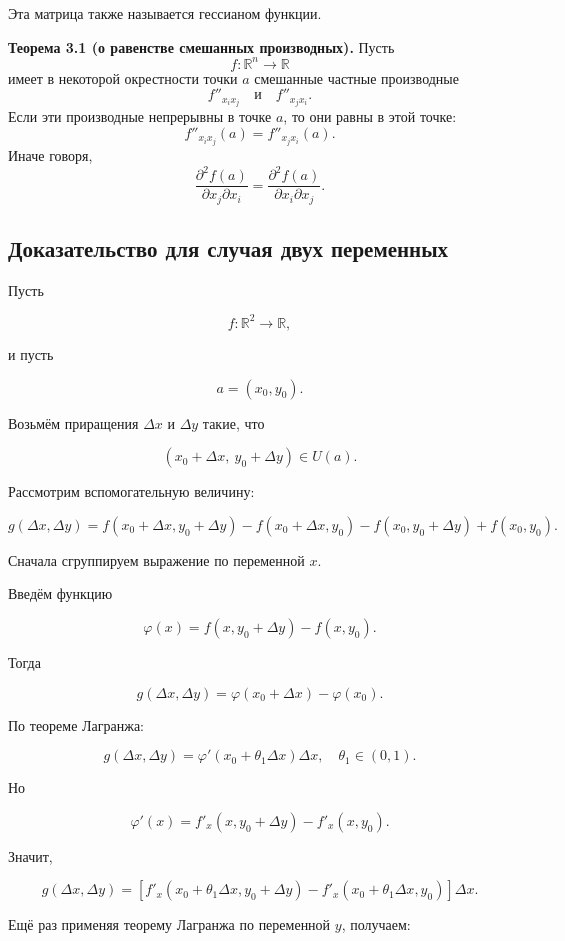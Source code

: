 \documentclass[a4paper,12pt]{article}
\begin{document}
Эта матрица также называется гессианом функции.

\begin{theorembox}
\textbf{Теорема 3.1 (о равенстве смешанных производных).}
Пусть
\[
f:\mathbb{R}^n\to\mathbb{R}
\]
имеет в некоторой окрестности точки $a$ смешанные частные производные
\[
f''_{x_i x_j}
\quad
\text{и}
\quad
f''_{x_j x_i}.
\]
Если эти производные непрерывны в точке $a$, то они равны в этой точке:
\[
f''_{x_i x_j}(a)
=
f''_{x_j x_i}(a).
\]
Иначе говоря,
\[
\frac{\partial^2 f(a)}{\partial x_j\partial x_i}
=
\frac{\partial^2 f(a)}{\partial x_i\partial x_j}.
\]
\end{theorembox}

\subsection*{Доказательство для случая двух переменных}

Пусть

\[
f:\mathbb{R}^2\to\mathbb{R},
\]

и пусть

\[
a=(x_0,y_0).
\]

Возьмём приращения $\Delta x$ и $\Delta y$ такие, что

\[
(x_0+\Delta x,\ y_0+\Delta y)\in U(a).
\]

Рассмотрим вспомогательную величину:

\[
g(\Delta x,\Delta y)
=
f(x_0+\Delta x,y_0+\Delta y)
-
f(x_0+\Delta x,y_0)
-
f(x_0,y_0+\Delta y)
+
f(x_0,y_0).
\]

Сначала сгруппируем выражение по переменной $x$.

Введём функцию

\[
\varphi(x)
=
f(x,y_0+\Delta y)
-
f(x,y_0).
\]

Тогда

\[
g(\Delta x,\Delta y)
=
\varphi(x_0+\Delta x)
-
\varphi(x_0).
\]

По теореме Лагранжа:

\[
g(\Delta x,\Delta y)
=
\varphi'(x_0+\theta_1\Delta x)\Delta x,
\quad
\theta_1\in(0,1).
\]

Но

\[
\varphi'(x)
=
f'_x(x,y_0+\Delta y)
-
f'_x(x,y_0).
\]

Значит,

\[
g(\Delta x,\Delta y)
=
\left[
f'_x(x_0+\theta_1\Delta x,y_0+\Delta y)
-
f'_x(x_0+\theta_1\Delta x,y_0)
\right]\Delta x.
\]

Ещё раз применяя теорему Лагранжа по переменной $y$, получаем:
\end{document}
